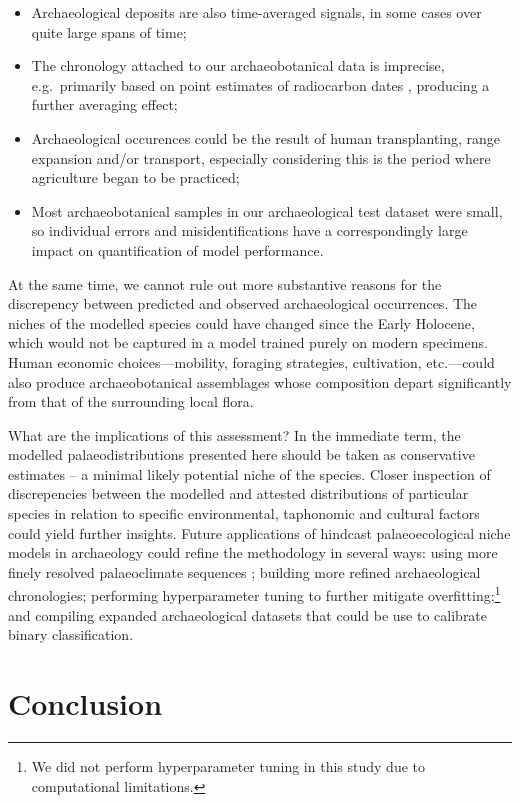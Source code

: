 \documentclass[
  authoryear,
  preprint]{elsarticle}
\providecommand{\tightlist}{%
  \setlength{\itemsep}{0pt}\setlength{\parskip}{0pt}}
\begin{document}
\begin{itemize}
\tightlist
\item
  Archaeological deposits are also time-averaged signals, in some cases
  over quite large spans of time;
\item
  The chronology attached to our archaeobotanical data is imprecise,
  e.g.~primarily based on point estimates of radiocarbon dates
  \citep{Michczynski2007}, producing a further averaging effect;
\item
  Archaeological occurences could be the result of human transplanting,
  range expansion and/or transport, especially considering this is the
  period where agriculture began to be practiced;
\item
  Most archaeobotanical samples in our archaeological test dataset were
  small, so individual errors and misidentifications have a
  correspondingly large impact on quantification of model performance.
\end{itemize}

At the same time, we cannot rule out more substantive reasons for the
discrepency between predicted and observed archaeological occurrences.
The niches of the modelled species could have changed since the Early
Holocene, which would not be captured in a model trained purely on
modern specimens. Human economic choices---mobility, foraging
strategies, cultivation, etc.---could also produce archaeobotanical
assemblages whose composition depart significantly from that of the
surrounding local flora.

What are the implications of this assessment? In the immediate term, the
modelled palaeodistributions presented here should be taken as
conservative estimates -- a minimal likely potential niche of the
species. Closer inspection of discrepencies between the modelled and
attested distributions of particular species in relation to specific
environmental, taphonomic and cultural factors could yield further
insights. Future applications of hindcast palaeoecological niche models
in archaeology could refine the methodology in several ways: using more
finely resolved palaeoclimate sequences \citep[e.g.][]{KargerEtAl2023};
building more refined archaeological chronologies; performing
hyperparameter tuning to further mitigate overfitting;\footnote{We did
  not perform hyperparameter tuning in this study due to computational
  limitations.} and compiling expanded archaeological datasets that
could be use to calibrate binary classification.

\section{Conclusion}\label{conclusion}
\end{document}
